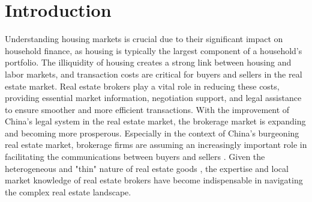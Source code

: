 \documentclass[11pt]{article}
\begin{document}
\clearpage
\egroup
\setcounter{page}{1}



\section{Introduction \label{sec:introduction}}

\noindent

Understanding housing markets is crucial due to their significant impact on household finance, as housing is typically the largest component of a household's portfolio. The illiquidity of housing creates a strong link between housing and labor markets, and transaction costs are critical for buyers and sellers in the real estate market. Real estate brokers play a vital role in reducing these costs, providing essential market information, negotiation support, and legal assistance to ensure smoother and more efficient transactions. With the improvement of China's legal system in the real estate market, the brokerage market is expanding and becoming more prosperous. Especially in the context of China's burgeoning real estate market, brokerage firms are assuming an increasingly important role in facilitating the communications between buyers and sellers \citep{glaeser_real_2017}. Given the heterogeneous and "thin" nature of real estate goods \citep{HAN2015813}, the expertise and local market knowledge of real estate brokers have become indispensable in navigating the complex real estate landscape.
\end{document}

